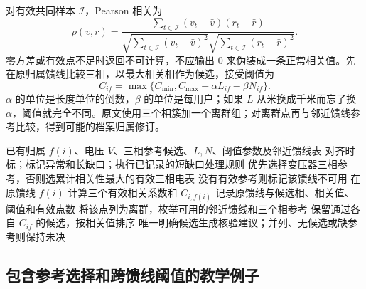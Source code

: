 \documentclass[UTF8,11pt,fontset=fandol,openany,oneside]{ctexbook}
\theoremstyle{definition}
\theoremstyle{remark}
\numberwithin{equation}{chapter}
\begin{document}
对有效共同样本 $\mathcal I$，Pearson 相关为
\begin{equation}
 \rho(v,r)=\frac{\sum_{t\in\mathcal I}(v_t-\bar v)(r_t-\bar r)}
 {\sqrt{\sum_{t\in\mathcal I}(v_t-\bar v)^2}
  \sqrt{\sum_{t\in\mathcal I}(r_t-\bar r)^2}}.
 \label{eq:dq_s8_corr}
\end{equation}
零方差或有效点不足时返回不可计算，不应输出 0 来伪装成一条正常相关值。先在原归属馈线比较三相，以最大相关相作为候选，接受阈值为
\begin{equation}
 C_{if}=\max\{C_{\min},C_{\max}-\alpha L_{if}-\beta N_{if}\}.
 \label{eq:dq_s8_threshold}
\end{equation}
$\alpha$ 的单位是长度单位的倒数，$\beta$ 的单位是每用户；如果 $L$ 从米换成千米而忘了换 $\alpha$，阈值就完全不同。原文使用三个相簇加一个离群组；对离群点再与邻近馈线参考比较，得到可能的档案归属修订。

\begin{algorithm}[tbp]
\caption{S8 的实际匹配链：原流程整理，异常出口显式化}
\label{alg:dq_s8}
\begin{algorithmic}[1]
\Require 已有归属 $f(i)$、电压 $V$、三相参考候选、$L,N$、阈值参数及邻近馈线表
\State 对齐时标；标记异常和长缺口；执行已记录的短缺口处理规则
 \State 优先选择变压器三相参考，否则选累计相关性最大的有效三相电表
 \State 没有有效参考则标记该馈线不可用
\EndFor
{}
 \State 在原馈线 $f(i)$ 计算三个有效相关系数和 $C_{i,f(i)}$
   \State 记录原馈线与候选相、相关值、阈值和有效点数
 \Else
   \State 将该点列为离群，枚举可用的邻近馈线和三个相参考
   \State 保留通过各自 $C_{if}$ 的候选，按相关值排序
   \State 唯一明确候选生成核验建议；并列、无候选或缺参考则保持未决
 \EndIf
\EndFor
\end{algorithmic}
\end{algorithm}

\subsection{包含参考选择和跨馈线阈值的教学例子}
\end{document}
